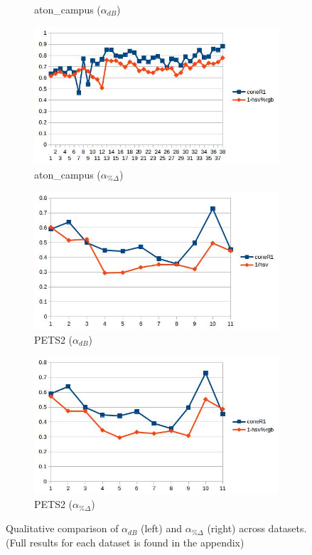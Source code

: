\documentclass[12pt]{report}
\begin{document}
\begin{figure}
\begin{subfigure}{.49\linewidth}
  \caption{aton\_campus ($\alpha_{dB}$)}
\end{subfigure}
\begin{subfigure}{.49\linewidth}
  \includegraphics[width=1\linewidth]{figures/correlations/rgb/campus_hsv.jpg}
  \caption{aton\_campus ($\alpha_{\%\Delta}$)}
\end{subfigure}
\hfill
\begin{subfigure}{.49\linewidth}
  \includegraphics[width=1\linewidth]{figures/correlations/db/pets2_hsv.jpg}
  \caption{PETS2 ($\alpha_{dB}$)}
\end{subfigure}
\begin{subfigure}{.49\linewidth}
  \includegraphics[width=1\linewidth]{figures/correlations/rgb/pets2_hsv.jpg}
  \caption{PETS2 ($\alpha_{\%\Delta}$)}
\end{subfigure}

\caption{Qualitative comparison of $\alpha_{dB}$ (left) and $\alpha_{\%\Delta}$ (right) across datasets. (Full results for each dataset is found in the appendix)}
\label{fig:corr_compare}
\end{figure}
\end{document}
